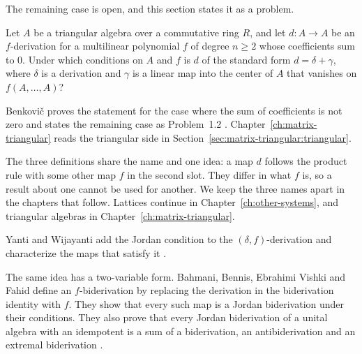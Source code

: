 The remaining case is open, and this section states it as a problem. %

\begin{problem}\label{prob:open:fderiv}
Let $A$ be a triangular algebra over a commutative ring $R$, and let $d\colon
A\to A$ be an $f$-derivation for a multilinear polynomial $f$ of degree $n\ge2$
whose coefficients sum to $0$.
Under which conditions on $A$ and $f$ is $d$ of the standard form
$d=\delta+\gamma$, where $\delta$ is a derivation and $\gamma$ is a linear map
into the center of $A$ that vanishes on $f(A,\dots,A)$?
\end{problem}

Benkovi\v{c} proves the statement for the case where the sum of coefficients is
not zero \cite[Theorem~1.1]{Benkovic2014} and states the remaining case as
Problem~1.2 \cite[Problem~1.2]{Benkovic2014}. Chapter~\ref{ch:matrix-triangular}
reads the triangular side in Section~\ref{sec:matrix-triangular:triangular}.

The three definitions share the name and one idea: a map $d$ follows the product rule
with some other map $f$ in the second slot. They differ in what $f$ is, so a result
about one cannot be used for another. We keep the three names apart in the chapters
that follow. Lattices continue in Chapter~\ref{ch:other-systems}, and triangular
algebras in Chapter~\ref{ch:matrix-triangular}.

Yanti and Wijayanti add the Jordan condition to the $(\delta,f)$-derivation
and characterize the maps that satisfy it
\cite[Abstract, p.~1]{YantiWijayanti2025}.

The same idea has a two-variable form. Bahmani, Bennis, Ebrahimi Vishki and
Fahid define an $f$-biderivation by replacing the derivation in the biderivation
identity with $f$. They show that every such map is a Jordan biderivation under
their conditions. They also prove that every Jordan biderivation of a unital
algebra with an idempotent is a sum of a biderivation, an antibiderivation and an
extremal biderivation \cite[Theorem~2.7]{BahmaniBennisEbrahimiFahid2021Bideriv}.
